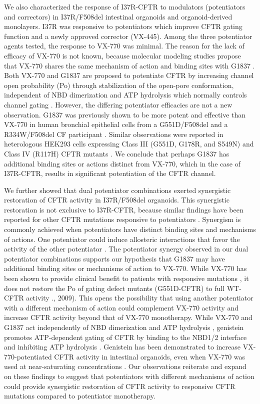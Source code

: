 We also characterized the response of I37R-CFTR to modulators (potentiators and correctors) in I37R/F508del intestinal organoids and organoid-derived monolayers. I37R was responsive to potentiators which improve CFTR gating function and a newly approved corrector (VX-445). Among the three potentiator agents tested, the response to VX-770 was minimal. The reason for the lack of efficacy of VX-770 is not known, because molecular modeling studies propose that VX-770 shares the same mechanism of action and binding sites with G1837 \cite{liu2019, yeh2019}. Both VX-770 and G1837 are proposed to potentiate CFTR by increasing channel open probability (Po) through stabilization of the open-pore conformation, independent of NBD dimerization and ATP hydrolysis which normally controls channel gating \cite{vangoor2009, yeh2017}. However, the differing potentiator efficacies are not a new observation. G1837 was previously shown to be more potent and effective than VX-770 in human bronchial epithelial cells from a G551D/F508del and a R334W/F508del CF participant \cite{gees2018, vanderplas2018}. Similar observations were reported in heterologous HEK293 cells expressing Class III (G551D, G178R, and S549N) and Class IV (R117H) CFTR mutants \cite{gees2018, vanderplas2018}. We conclude that perhaps G1837 has additional binding sites or actions distinct from VX-770, which in the case of I37R-CFTR, results in significant potentiation of the CFTR channel.

We further showed that dual potentiator combinations exerted synergistic restoration of CFTR activity in I37R/F508del organoids. This synergistic restoration is not exclusive to I37R-CFTR, because similar findings have been reported for other CFTR mutations responsive to potentiators \cite{dekkers2016a, phuan2018,phuan2019, veit2020}. Synergism is commonly achieved when potentiators have distinct binding sites and mechanisms of actions. One potentiator could induce allosteric interactions that favor the activity of the other potentiator \cite{nussinov2013}. The potentiator synergy observed in our dual potentiator combinations supports our hypothesis that G1837 may have additional binding sites or mechanisms of action to VX-770. While VX-770 has been shown to provide clinical benefit to patients with responsive mutations \cite{berkers2020, mckone2014, volkova2020}, it does not restore the Po of gating defect mutants (G551D-CFTR) to full WT-CFTR activity \cite{vangoor2009}., 2009). This opens the possibility that using another potentiator with a different mechanism of action could complement VX-770 activity and increase CFTR activity beyond that of VX-770 monotherapy. While VX-770 and G1837 act independently of NBD dimerization and ATP hydrolysis \cite{vangoor2009,yeh2017}, genistein promotes ATP-dependent gating of CFTR by binding to the NBD1/2 interface and inhibiting ATP hydrolysis \cite{sohma2013}. Genistein has been demonstrated to increase VX-770-potentiated CFTR activity in intestinal organoids, even when VX-770 was used at near-saturating concentrations \cite{dekkers2016a}. Our observations reiterate and expand on these findings to suggest that potentiators with different mechanisms of action could provide synergistic restoration of CFTR activity to responsive CFTR mutations compared to potentiator monotherapy.

